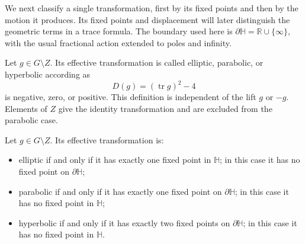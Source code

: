 We next classify a single transformation, first by its fixed points and then by the motion it produces. Its fixed points and displacement will later distinguish the geometric terms in a trace formula. The boundary used here is $\partial\mathbb H=\mathbb R\cup\{\infty\}$, with the usual fractional action extended to poles and infinity.

\begin{definition}\label{hyperbolic.types}
Let $g\in G\setminus Z$. Its effective transformation is called elliptic, parabolic, or hyperbolic according as
\[
 D(g)=(\operatorname{tr}g)^2-4
\]
is negative, zero, or positive. This definition is independent of the lift $g$ or $-g$. Elements of $Z$ give the identity transformation and are excluded from the parabolic case.
\end{definition}

\begin{proposition}\label{hyperbolic.fixed-point-classification}
Let $g\in G\setminus Z$. Its effective transformation is:
\begin{itemize}
\item elliptic if and only if it has exactly one fixed point in $\mathbb H$; in this case it has no fixed point on $\partial\mathbb H$;
\item parabolic if and only if it has exactly one fixed point on $\partial\mathbb H$; in this case it has no fixed point in $\mathbb H$;
\item hyperbolic if and only if it has exactly two fixed points on $\partial\mathbb H$; in this case it has no fixed point in $\mathbb H$.
\end{itemize}
\end{proposition}

